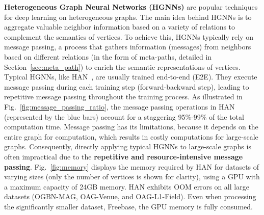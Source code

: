 \documentclass[lettersize,journal]{IEEEtran}
\begin{document}
\textbf{Heterogeneous Graph Neural Networks (HGNNs)} are popular techniques for deep learning on heterogeneous graphs.
The main idea behind HGNNs is to aggregate valuable neighbor information based on a variety of relations to complement the semantics of vertices.
To achieve this, HGNNs typically rely on message passing, a process that gathers information (messages) from neighbors based on different relations (in the form of meta-paths, detailed in Section~\ref{sec:meta_path}) to enrich the semantic representations of vertices.
Typical HGNNs, like HAN~\cite{DBLP:conf/www/WangJSWYCY19}, are usually trained end-to-end (E2E).
They execute message passing during each training step (forward-backward step), leading to repetitive message passing throughout the training process.
As illustrated in Fig.~\ref{fig:message_passing_ratio}, the message passing operations in HAN (represented by the blue bars) account for a staggering 95\%-99\% of the total computation time.
Message passing has its limitations, because it depends on the entire graph for computation, which results in costly computations for large-scale graphs. 
Consequently, directly applying typical HGNNs to large-scale graphs is often impractical due to the \textbf{repetitive and resource-intensive message passing}.
Fig.~\ref{fig:memory} displays the memory required by HAN for datasets of varying sizes (only the number of vertices is shown for clarity), using a GPU with a maximum capacity of 24GB memory.
HAN exhibits OOM errors on all large datasets (OGBN-MAG, OAG-Venue, and OAG-L1-Field).
Even when processing the significantly smaller dataset, Freebase, the GPU memory is fully consumed.
\end{document}
